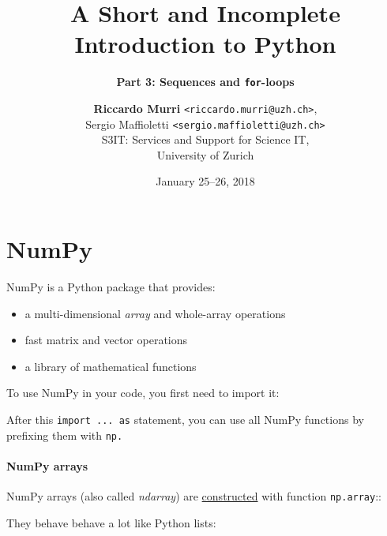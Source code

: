 \documentclass[english,serif,mathserif,xcolor=pdftex,dvipsnames,table]{beamer}
\title[3. Sequences and loops]{%
  A Short and Incomplete Introduction to Python
}
\subtitle{\bfseries Part 3: Sequences and \texttt{for}-loops}
\author[R.~Murri]{%
  \textbf{Riccardo Murri} \texttt{<riccardo.murri@uzh.ch>}, \\
  Sergio Maffioletti \texttt{<sergio.maffioletti@uzh.ch>}
  \\
  S3IT: Services and Support for Science IT,
  \\
  University of Zurich
}
\date{January 25--26, 2018}
\begin{document}
\maketitle


\part{NumPy}

NumPy is a Python package that provides:

\begin{itemize}
\item
  a multi-dimensional \emph{array} and whole-array operations
\item
  fast matrix and vector operations
\item
  a library of mathematical functions
\end{itemize}

To use NumPy in your code, you first need to import it:

\begin{Shaded}
\begin{Highlighting}[]
  
\end{Highlighting}
\end{Shaded}

After this \texttt{import\ ...\ as} statement, you can use all NumPy
functions by prefixing them with \texttt{np.}

\subsection{NumPy arrays}\label{numpy-arrays}

NumPy arrays (also called \emph{ndarray}) are
\href{https://docs.scipy.org/doc/numpy/user/basics.creation.html}{constructed}
with function \texttt{np.array}::

\begin{Shaded}
\begin{Highlighting}[]
\OperatorTok{=} \NormalTok{np.array([}\NormalTok{, }\NormalTok{, }\NormalTok{, }\NormalTok{, }\NormalTok{])}
\end{Highlighting}
\end{Shaded}

They behave behave a lot like Python lists:

\begin{Shaded}
\begin{Highlighting}[]
\NormalTok{a[}\NormalTok{]}
\end{Highlighting}
\end{Shaded}
\end{document}
